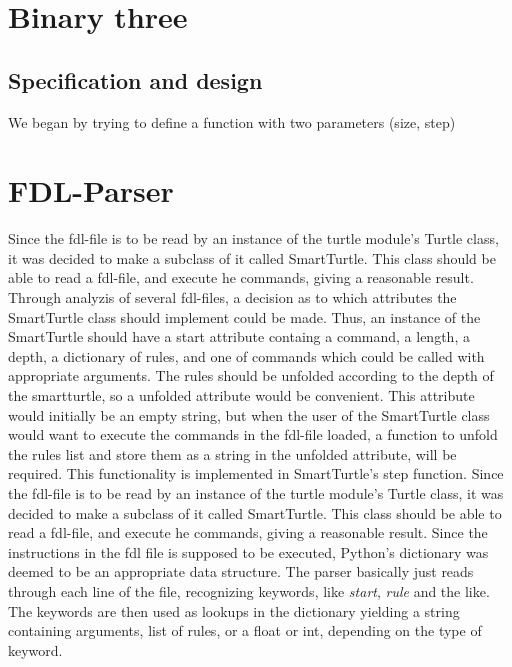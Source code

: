 \documentclass[titlepage]{article}
\begin{document}
\section{Binary three}
\subsection{Specification and design}
We began by trying to define a function with two parameters (size, step)
\section{FDL-Parser}
Since the fdl-file is to be read by an instance of the turtle module's Turtle class, it was decided to make a subclass of it called SmartTurtle. This class should be able to read a fdl-file, and execute he commands, giving a reasonable result. Through analyzis of several fdl-files, a decision as to which attributes the SmartTurtle class should implement could be made. Thus, an instance of the SmartTurtle should have a start attribute containg a command, a length, a depth, a dictionary of rules, and one of commands which could be called with appropriate arguments. The rules should be unfolded according to the depth of the smartturtle, so a unfolded attribute would be convenient. This attribute would initially be an empty string, but when the user of the SmartTurtle class would want to execute the commands in the fdl-file loaded, a function to unfold the rules list and store them as a string in the unfolded attribute, will be required. This functionality is implemented in SmartTurtle's step function.
Since the fdl-file is to be read by an instance of the turtle module's Turtle class, it was decided to make a subclass of it called SmartTurtle. This class should be able to read a fdl-file, and execute he commands, giving a reasonable result. 
Since the instructions in the fdl file is supposed to be executed, Python's dictionary was deemed to be an appropriate data structure. The parser basically just reads through each line of the file, recognizing keywords, like \textit{start}, \textit{rule} and the like. The keywords are then used as lookups in the dictionary yielding a string containing arguments, list of rules, or a float or int, depending on the type of keyword. 
\end{document}
